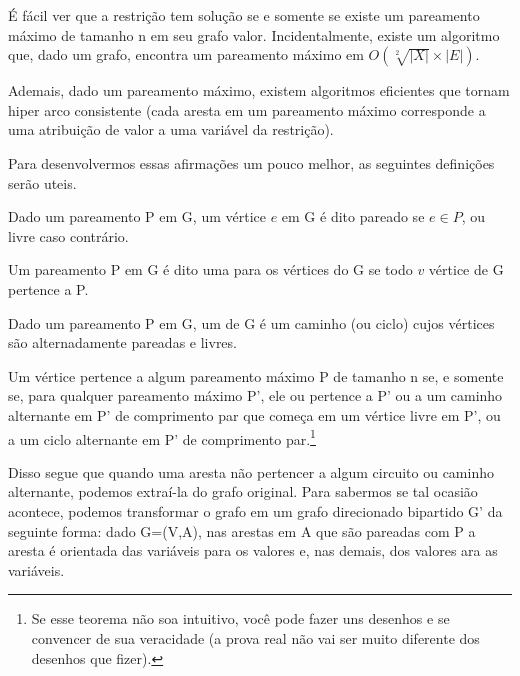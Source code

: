 É fácil ver que a restrição  tem solução se e
somente se existe um pareamento máximo de tamanho n em seu grafo
valor. Incidentalmente, existe um algoritmo que, dado um grafo,
encontra um pareamento máximo em $O(\sqrt[2]{|X|}\times|E|)$.

Ademais, dado um pareamento máximo, existem algoritmos eficientes que
tornam  hiper arco consistente (cada aresta em
um pareamento máximo corresponde a uma atribuição de valor a uma
variável da restrição).

Para desenvolvermos essas afirmações um pouco melhor, as seguintes
definições serão uteis.

\begin{definition}
  Dado um pareamento P em G, um vértice $e$ em G é dito pareado se
  $e\in P$, ou livre caso contrário.
\end{definition}

\begin{definition}
  Um pareamento P em G é dito uma  para os
  vértices do G se todo $v$ vértice de G pertence a P.
\end{definition}

\begin{definition}
  Dado um pareamento P em G, um  de G é um caminho (ou ciclo) cujos vértices são
  alternadamente pareadas e livres.
\end{definition}

\begin{theorem}
  Um vértice pertence a algum pareamento máximo P de tamanho n se, e
  somente se, para qualquer pareamento máximo P', ele ou pertence a P'
  ou a um caminho alternante em P' de comprimento par que começa em um
  vértice livre em P', ou a um ciclo alternante em P' de comprimento
  par.\footnote{Se esse teorema não soa intuitivo, você pode fazer uns
    desenhos e se convencer de sua veracidade (a prova real não vai
    ser muito diferente dos desenhos que fizer).}
\end{theorem}

Disso segue que quando uma aresta não pertencer a algum circuito ou
caminho alternante, podemos extraí-la do grafo original.  Para
sabermos se tal ocasião acontece, podemos transformar o grafo em um
grafo direcionado bipartido G' da seguinte forma: dado G=(V,A), nas
arestas em A que são pareadas com P a aresta é orientada das variáveis
para os valores e, nas demais, dos valores ara as variáveis.

